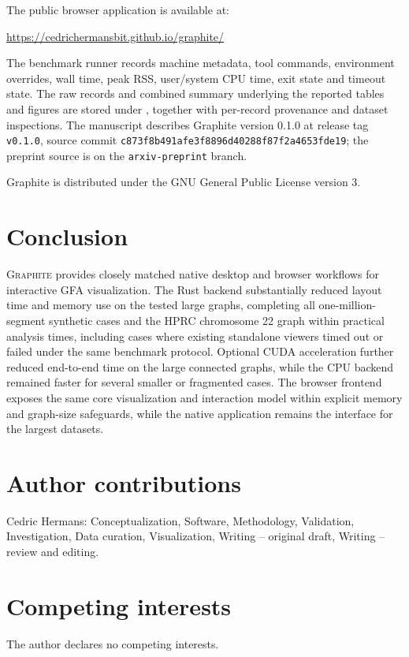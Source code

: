 \documentclass[11pt]{article}
\newcommand{\graphite}{\textsc{Graphite}\xspace}
\begin{document}
The public browser application is available at:

\begin{center}
\url{https://cedrichermansbit.github.io/graphite/}
\end{center}

The benchmark runner records machine metadata, tool commands, environment overrides, wall time, peak RSS, user/system CPU time, exit state and timeout state. The raw records and combined summary underlying the reported tables and figures are stored under , together with per-record provenance and dataset inspections. The manuscript describes Graphite version 0.1.0 at release tag \texttt{v0.1.0}, source commit \texttt{c873f8b491afe3f8896d40288f87f2a4653fde19}; the preprint source is on the \texttt{arxiv-preprint} branch.

Graphite is distributed under the GNU General Public License version 3.

\section{Conclusion}
\graphite provides closely matched native desktop and browser workflows for interactive GFA visualization. The Rust backend substantially reduced layout time and memory use on the tested large graphs, completing all one-million-segment synthetic cases and the HPRC chromosome 22 graph within practical analysis times, including cases where existing standalone viewers timed out or failed under the same benchmark protocol. Optional CUDA acceleration further reduced end-to-end time on the large connected graphs, while the CPU backend remained faster for several smaller or fragmented cases. The browser frontend exposes the same core visualization and interaction model within explicit memory and graph-size safeguards, while the native application remains the interface for the largest datasets.

\section*{Author contributions}
Cedric Hermans: Conceptualization, Software, Methodology, Validation, Investigation, Data curation, Visualization, Writing -- original draft, Writing -- review and editing.

\section*{Competing interests}
The author declares no competing interests.
\end{document}
